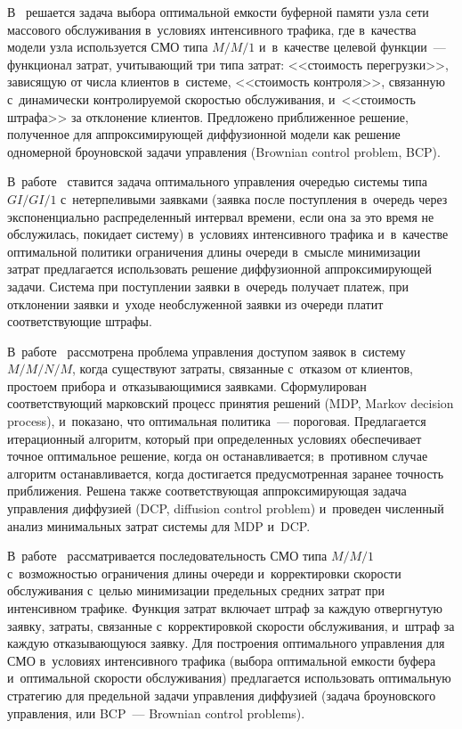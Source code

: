 \begin{multicols}{2}
В~\cite{3-aga} решается задача выбора оптимальной 
емкости буферной памяти узла сети массового обслуживания в~условиях 
интенсивного трафика, где в~качества модели узла используется СМО типа 
$M/M/1$ и~в~качестве целевой функции~--- функционал затрат, учитывающий 
три типа затрат: <<стоимость перегрузки>>, зависящую от числа клиентов 
в~системе, <<стоимость контроля>>, связанную с~динамически 
контролируемой скоростью обслуживания, и~<<стоимость штрафа>> за 
отклонение клиентов. Предложено приближенное решение, полученное для 
аппроксимирующей диффузионной модели как решение одномерной 
броуновской задачи управления (Brownian control problem, BCP). 


В~работе~\cite{4-aga} ставится задача оптимального управ\-ле\-ния очередью 
системы типа $GI/GI/1$ с~нетерпеливыми заявками (заявка после поступления 
в~очередь через экспоненциально распределенный интервал времени, если она 
за это время не обслужилась, покидает сис\-те\-му) в~условиях интенсивного 
трафика и~в~качестве оптимальной политики ограничения длины очереди 
в~смыс\-ле \mbox{минимизации} затрат предлагается использовать решение 
диффузионной аппроксимирующей задачи. Сис\-те\-ма при поступлении заявки 
в~очередь получает платеж, при отклонении заявки и~уходе необслуженной 
заявки из очереди платит соответствующие штрафы. 

В~работе~\cite{5-aga} 
рассмотрена проб\-ле\-ма управ\-ле\-ния доступом заявок в~систему 
$M/M/N/M$, когда существуют затраты, связанные с~отказом от клиентов, 
простоем прибора и~отказывающимися заявками. Сформулирован 
соответствующий марковский процесс принятия решений
 (MDP, Markov decision process), и~показано, 
что оптимальная политика~--- пороговая. Предлагается итерационный 
алгоритм, который при определенных условиях обеспечивает точное 
оптимальное решение, когда он останавливается; в~противном случае алгоритм 
останавливается, когда достигается предусмотренная заранее точность 
приближения. Решена также соответствующая ап\-прок\-си\-ми\-ру\-ющая задача 
управления диффузией (DCP, diffusion control problem) и~проведен численный анализ минимальных 
затрат системы для MDP и~DCP. 

В~работе~\cite{6-aga} рассматривается 
последовательность СМО типа $M/M/1$ с~воз\-мож\-ностью ограничения длины 
очереди и~корректировки ско\-рости обслуживания с~целью минимизации 
предельных средних затрат при интенсивном трафике. Функция затрат 
включает штраф за каждую отвергнутую заявку, затраты, связанные 
с~корректировкой скорости обслуживания, и~штраф за каждую 
отказывающуюся заявку. Для построения оптимального управления для СМО 
в~условиях интенсивного трафика (выбора оптимальной емкости буфера 
и~оптимальной скорости обслуживания) предлагается использовать 
оптимальную стратегию для предельной задачи управления диффузией (задача 
броуновского управ\-ле\-ния, или BCP~--- Brownian control problems). 


\end{multicols}
